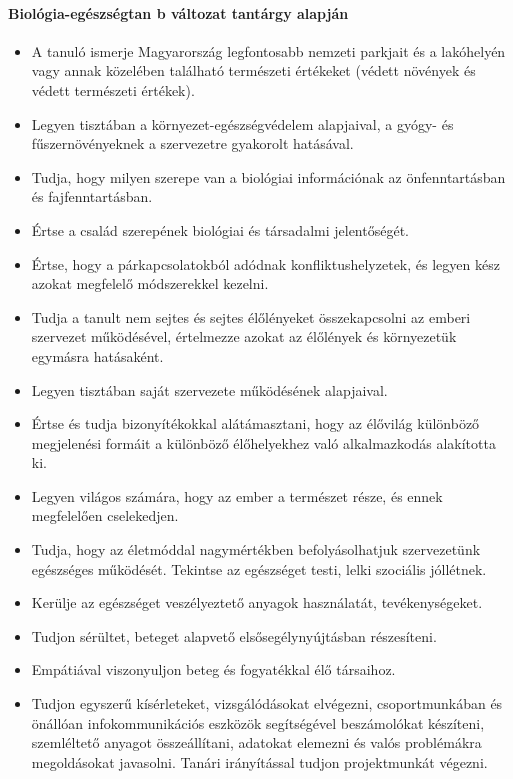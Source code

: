 \paragraph{Biológia-egészségtan
	b változat tantárgy alapján}
\begin{itemize}
\item A tanuló ismerje Magyarország legfontosabb nemzeti parkjait és a lakóhelyén vagy annak közelében található természeti értékeket (védett növények és védett természeti értékek).
\item Legyen tisztában a környezet-egészségvédelem alapjaival, a gyógy- és fűszernövényeknek a szervezetre gyakorolt hatásával.
\item Tudja, hogy milyen szerepe van a biológiai információnak az önfenntartásban és fajfenntartásban.
\item Értse a család szerepének biológiai és társadalmi jelentőségét.
\item Értse, hogy a párkapcsolatokból adódnak konfliktushelyzetek, és legyen kész azokat megfelelő módszerekkel kezelni.
\item Tudja a tanult nem sejtes és sejtes élőlényeket összekapcsolni az emberi szervezet működésével, értelmezze azokat az élőlények és környezetük egymásra hatásaként.
\item Legyen tisztában saját szervezete működésének alapjaival.
\item Értse és tudja bizonyítékokkal alátámasztani, hogy az élővilág különböző megjelenési formáit a különböző élőhelyekhez való alkalmazkodás alakította ki.
\item Legyen világos számára, hogy az ember a természet része, és ennek megfelelően cselekedjen.
\item Tudja, hogy az életmóddal nagymértékben befolyásolhatjuk szervezetünk egészséges működését. Tekintse az egészséget testi, lelki szociális jóllétnek.
\item Kerülje az egészséget veszélyeztető anyagok használatát, tevékenységeket.
\item Tudjon sérültet, beteget alapvető elsősegélynyújtásban részesíteni.
\item Empátiával viszonyuljon beteg és fogyatékkal élő társaihoz.
\item Tudjon egyszerű kísérleteket, vizsgálódásokat elvégezni, csoportmunkában és önállóan infokommunikációs eszközök segítségével beszámolókat készíteni, szemléltető anyagot összeállítani, adatokat elemezni és valós problémákra megoldásokat javasolni. Tanári irányítással tudjon projektmunkát végezni.
\end{itemize}
